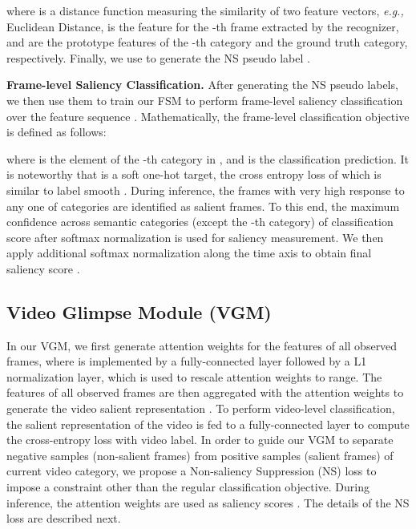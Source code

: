 \documentclass[runningheads]{llncs}
\begin{document}
where  is a distance function measuring the similarity of two feature vectors, \emph{e.g.,} Euclidean Distance,  is the feature for the -th frame extracted by the recognizer,  and  are the prototype features of the -th category and the ground truth category, respectively.
Finally, we use  to generate the NS pseudo label .


\noindent \textbf{Frame-level Saliency Classification.}
After generating the NS pseudo labels, we then use them to train our FSM to perform frame-level saliency classification over the feature sequence . Mathematically, the frame-level classification objective is defined as follows:

where  is the element of the -th category in , and  is the classification prediction. It is noteworthy that  is a soft one-hot target, the cross entropy loss of which is similar to label smooth \cite{labelsmooth}.
During inference, the frames with very high response to any one of  categories are identified as salient frames. To this end, the maximum confidence across  semantic categories (except the -th category) of classification score after softmax normalization is used for saliency measurement. We then apply additional softmax normalization along the time axis to obtain final saliency score .

























\subsection{Video Glimpse Module (VGM)}\label{vgmodule}
In our VGM, we first generate attention weights  for the features of all observed frames, where  is implemented by a fully-connected layer followed by a L1 normalization layer, which is used to rescale attention weights to  range. The features of all observed frames are then aggregated with the attention weights to generate the video salient representation .
To perform video-level classification, the salient representation of the video  is fed to a fully-connected layer to compute the cross-entropy loss with video label. In order to guide our VGM to separate negative samples (non-salient frames) from positive samples (salient frames) of current video category, we propose a Non-saliency Suppression (NS) loss to impose a constraint other than the regular classification objective. During inference, the attention weights are used as saliency scores . The details of the NS loss are described next.
\end{document}
